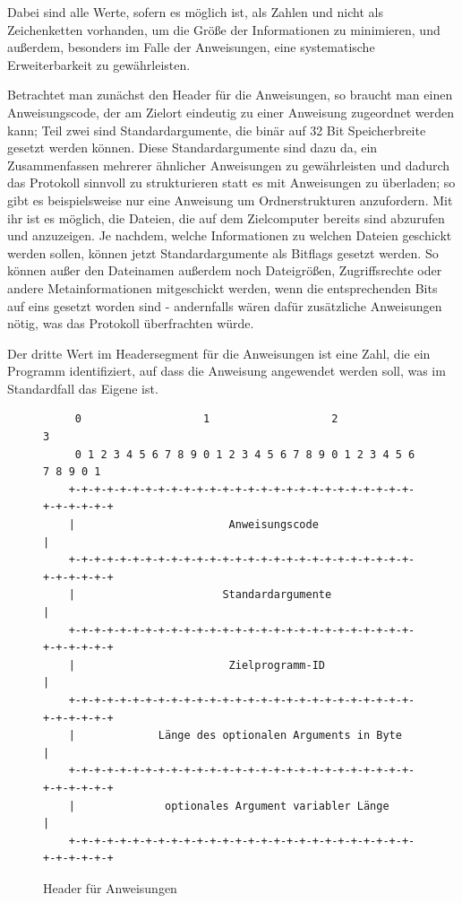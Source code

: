 Dabei sind alle Werte, sofern es möglich ist, als Zahlen und nicht als Zeichenketten vorhanden, um die Größe der Informationen zu minimieren, und außerdem, besonders im Falle der Anweisungen, eine systematische Erweiterbarkeit zu gewährleisten.\\\par
Betrachtet man zunächst den Header für die Anweisungen, so braucht man einen Anweisungscode, der am Zielort eindeutig zu einer Anweisung zugeordnet werden kann; Teil zwei sind Standardargumente, die binär auf 32 Bit Speicherbreite gesetzt werden können.
Diese Standardargumente sind dazu da, ein Zusammenfassen mehrerer ähnlicher Anweisungen zu gewährleisten und dadurch das Protokoll sinnvoll zu strukturieren statt es mit Anweisungen zu überladen; so gibt es beispielsweise nur eine Anweisung um Ordnerstrukturen anzufordern.  
Mit ihr ist es möglich, die Dateien, die auf dem Zielcomputer bereits sind abzurufen und anzuzeigen. 
Je nachdem, welche Informationen zu welchen Dateien geschickt werden sollen, können jetzt Standardargumente als Bitflags gesetzt werden. 
So können außer den Dateinamen außerdem noch Dateigrößen, Zugriffsrechte oder andere Metainformationen mitgeschickt werden, wenn die entsprechenden Bits auf eins gesetzt worden sind - andernfalls wären dafür zusätzliche Anweisungen nötig, was das Protokoll überfrachten würde.\par 
Der dritte Wert im Headersegment für die Anweisungen ist eine Zahl, die ein Programm identifiziert, auf dass die Anweisung angewendet werden soll, was im Standardfall das Eigene ist.

\begin{figure}[h]
\begin{lstlisting}
     0                   1                   2                   3
     0 1 2 3 4 5 6 7 8 9 0 1 2 3 4 5 6 7 8 9 0 1 2 3 4 5 6 7 8 9 0 1
    +-+-+-+-+-+-+-+-+-+-+-+-+-+-+-+-+-+-+-+-+-+-+-+-+-+-+-+-+-+-+-+-+
    |                        Anweisungscode                         |
    +-+-+-+-+-+-+-+-+-+-+-+-+-+-+-+-+-+-+-+-+-+-+-+-+-+-+-+-+-+-+-+-+
    |                       Standardargumente                       |
    +-+-+-+-+-+-+-+-+-+-+-+-+-+-+-+-+-+-+-+-+-+-+-+-+-+-+-+-+-+-+-+-+
    |                        Zielprogramm-ID                        |
    +-+-+-+-+-+-+-+-+-+-+-+-+-+-+-+-+-+-+-+-+-+-+-+-+-+-+-+-+-+-+-+-+
    |             Länge des optionalen Arguments in Byte            |
    +-+-+-+-+-+-+-+-+-+-+-+-+-+-+-+-+-+-+-+-+-+-+-+-+-+-+-+-+-+-+-+-+
    |              optionales Argument variabler Länge              |
    +-+-+-+-+-+-+-+-+-+-+-+-+-+-+-+-+-+-+-+-+-+-+-+-+-+-+-+-+-+-+-+-+
\end{lstlisting}
\caption{Header für Anweisungen}
\label{Anweisungs_Header}
\end{figure}

